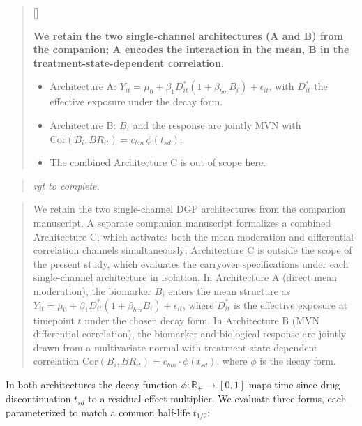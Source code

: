 \documentclass[
  11pt,
]{article}
\newcounter{pgraph}
\newenvironment{bullets}{%
  \stepcounter{pgraph}%
  \begin{quote}\small\sffamily\color[gray]{0.30}%
  {\normalfont\scriptsize\color[gray]{0.58}[\thepgraph]\enspace}}{%
  \end{quote}}
\newenvironment{rgt}{%
  \begin{quote}\small\itshape\color[RGB]{20,60,160}}{%
  \end{quote}}
\newenvironment{orig}{%
  \begin{quote}\normalsize\color[gray]{0.55}}{%
  \end{quote}}
\begin{document}
\begin{bullets}

\textbf{We retain the two single-channel architectures (A and B)
from the companion; A encodes the interaction in the mean, B in the
treatment-state-dependent correlation.}

\begin{itemize}\setlength{\itemsep}{2pt}\setlength{\parskip}{0pt}
\item Architecture A: $Y_{it} = \mu_0 + \beta_1 D_{it}^{*}(1 +
\beta_{bm} B_i) + \epsilon_{it}$, with $D_{it}^{*}$ the effective
exposure under the decay form.
\item Architecture B: $B_i$ and the response are jointly MVN with
$\text{Cor}(B_i, BR_{it}) = c_{bm}\,\phi(t_{sd})$.
\item The combined Architecture C is out of scope here.
\end{itemize}

\end{bullets}

\begin{rgt}
rgt to complete.

\end{rgt}

\begin{orig}
We retain the two single-channel DGP architectures from the
companion manuscript. A separate companion manuscript formalizes a
combined Architecture C, which activates both the mean-moderation
and differential-correlation channels simultaneously; Architecture C
is outside the scope of the present study, which evaluates the
carryover specifications under each single-channel architecture in
isolation. In Architecture A (direct mean moderation), the
biomarker \(B_i\)
enters the mean structure as
\(Y_{it} = \mu_0 + \beta_1 D_{it}^{*}(1 + \beta_{bm} B_i)
+ \epsilon_{it}\), where \(D_{it}^{*}\) is the effective exposure at
timepoint \(t\) under the chosen decay form. In Architecture B
(MVN differential correlation), the biomarker and biological
response are jointly drawn from a multivariate normal with
treatment-state-dependent correlation
\(\text{Cor}(B_i, BR_{it}) = c_{bm} \cdot \phi(t_{sd})\), where
\(\phi\) is the decay form.

\end{orig}

In both architectures the decay function \(\phi : \mathbb{R}_+
\to [0, 1]\) maps time since drug discontinuation \(t_{sd}\) to a
residual-effect multiplier. We evaluate three forms,
each parameterized to match a common half-life \(t_{1/2}\):
\end{document}
